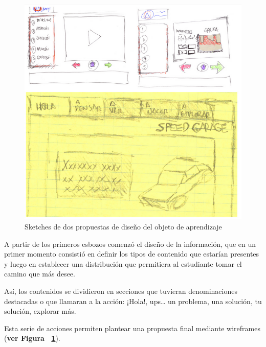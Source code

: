 \documentclass[twoside,letterpaper,11pt]{report}
\begin{document}
\begin{figure}[h!]
\label{sketches}
\includegraphics[width=1\textwidth]{aux/sketches}
\caption{Sketches de dos propuestas de diseño del objeto de aprendizaje}
\end{figure}


A partir de los primeros esbozos comenzó el diseño de la información, que en un primer momento consistió en definir los tipos de contenido que estarían presentes y luego en establecer una distribución que permitiera al estudiante tomar el camino que más desee.

Así, los contenidos se dividieron en secciones que tuvieran denominaciones destacadas o que llamaran a la acción: ¡Hola!, ups… un problema, una solución, tu solución, explorar más.

Esta serie de acciones permiten plantear una propuesta final mediante wireframes (\textbf{ver Figura ~\ref{sketches}}).
\end{document}
